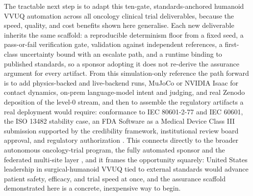The tractable next step is to adapt this ten-gate, standards-anchored humanoid
VVUQ automation across all oncology clinical trial deliverables, because the
speed, quality, and cost benefits shown here generalise. Each new deliverable
inherits the same scaffold: a reproducible determinism floor from a fixed seed, a
pass-or-fail verification gate, validation against independent references, a
first-class uncertainty bound with an escalate path, and a runtime binding to
published standards, so a sponsor adopting it does not re-derive the assurance
argument for every artifact. From this simulation-only reference the path forward
is to add physics-backed and live-backend runs, MuJoCo or NVIDIA Isaac for
contact dynamics, on-prem language-model intent and judging, and real Zenodo
deposition of the level-0 stream, and then to assemble the regulatory artifacts a
real deployment would require: conformance to IEC 80601-2-77 and IEC 60601, the
ISO 13482 stability case, an FDA Software as a Medical Device Class III
submission supported by the credibility framework, institutional review board
approval, and regulatory authorization \cite{iec8060127, iec60601, iso13482,
fda2023credibility}. This connects directly to the broader autonomous
oncology-trial program, the fully automated sponsor and the federated multi-site
layer \cite{kawchak2026sponsor, kawchak2026federated}, and it frames the
opportunity squarely: United States leadership in surgical-humanoid VVUQ tied to
external standards would advance patient safety, efficacy, and trial speed at
once, and the assurance scaffold demonstrated here is a concrete, inexpensive way
to begin.

